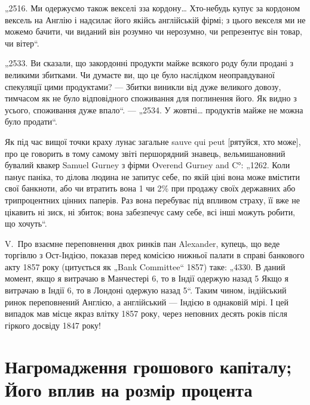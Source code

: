 „2516. Ми одержуємо також векселі зза кордону\dots{} Хто-небудь купує за кордоном вексель на Англію і
надсилає його якійсь англійській фірмі; з цього векселя ми не можемо бачити, чи виданий він розумно
чи нерозумно, чи репрезентує він товар, чи вітер“.

„2533. Ви сказали, що закордонні продукти майже всякого роду були продані з великими збитками. Чи
думаєте ви, що це було наслідком неоправдуваної
спекуляції цими продуктами? — Збитки виникли від дуже великого довозу, тимчасом як не було
відповідного споживання для поглинення його. Як видно з
усього, споживання дуже впало“. — „2534. У жовтні\dots{} продуктів майже не можна
було продати“.

Як під час вищої точки краху лунає загальне sauve qui peut [рятуйся, хто
може], про це говорить в тому самому звіті першорядний знавець, вельмишановний бувалий квакер Samuel
Gurney з фірми Overend Gurney and C°: „1262. Коли
панує паніка, то ділова людина не запитує себе, по якій ціні вона може вмістити свої банкноти, або
чи втратить вона 1 чи 2\% при продажу своїх державних або трипроцентних цінних паперів. Раз вона
перебуває під впливом страху, її вже не цікавить ні зиск, ні збиток; вона забезпечує саму себе, всі
інші
можуть робити, що хочуть“.

V.~Про взаємне переповнення двох ринків пан Alexander, купець, що веде
торгівлю з Ост-Індією, показав перед комісією нижньої палати в справі банкового акту 1857 року
(цитується як „Bank Committee“ 1857) таке: „4330. В даний
момент, якщо я витрачаю в Манчестері 6, то в Індії одержую назад
5 Якщо я витрачаю в Індії 6, то в Лондоні одержую назад
5“. Таким чином, індійський ринок переповнений Англією, а англійський — Індією в однаковій
мірі. І цей випадок мав місце якраз влітку 1857 року,
через неповних десять років після гіркого досвіду 1847 року!

\section{Нагромадження грошового капіталу; Його вплив на розмір процента}

